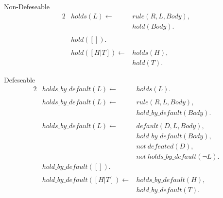 \documentclass[11pt]{article}
\begin{document}
  Non-Defeseable
  \begin{alignat}{2}
    &\label{eq:axiom1} holds(L) \leftarrow & rule(R, L, Body),\\       
    &                                       & hold(Body). \nonumber \\ \nonumber \\       
    & \label{eq:axiom2} hold([]). \\ \nonumber \\
    & \label{eq:axiom3} hold([H|T]) \leftarrow & holds(H),\\
    &                                             & hold(T). \nonumber 
  \end{alignat}


  Defeseable
  \begin{alignat}{2}
   & \label{eq:axiom4} holds\_by\_default(L) \leftarrow & holds(L).\\ \nonumber \\       
   & \label{eq:axiom5} holds\_by\_default(L) \leftarrow & rule(R, L, Body),\\       
   &                                                  & hold\_by\_default(Body). \nonumber \\ \nonumber \\
   & \label{eq:axiom6} holds\_by\_default(L) \leftarrow & default(D, L, Body),\\       
   &                                                  & hold\_by\_default(Body), \nonumber \\
   &                                                  & not~defeated(D), \nonumber \\
   &                                                  & not~holds\_by\_default(\neg L). \nonumber \\
   & \label{eq:axiom7} hold\_by\_default([]). \\ \nonumber \\
   & \label{eq:axiom8} hold\_by\_default([H|T]) \leftarrow & holds\_by\_default(H),\\
   &                                             & hold\_by\_default(T). \nonumber 
  \end{alignat}
\end{document}
